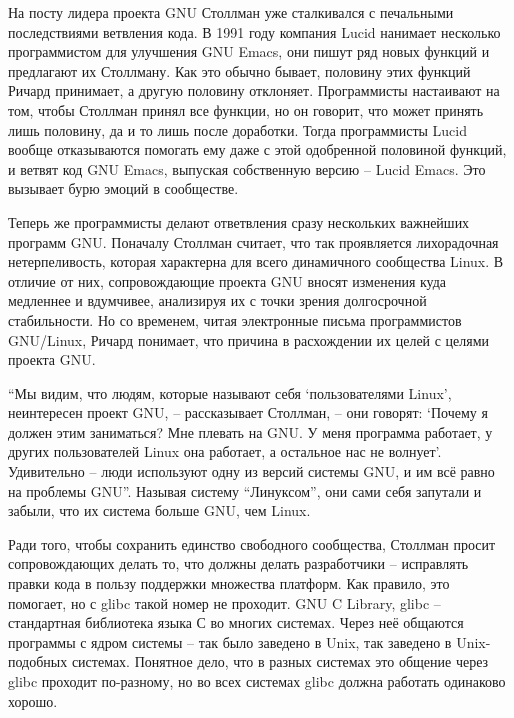 На посту лидера проекта GNU Столлман уже сталкивался с печальными последствиями ветвления кода. В 1991 году компания Lucid нанимает несколько программистом для улучшения GNU Emacs, они пишут ряд новых функций и предлагают их Столлману. Как это обычно бывает, половину этих функций Ричард принимает, а другую половину отклоняет. Программисты настаивают на том, чтобы Столлман принял все функции, но он говорит, что может принять лишь половину, да и то лишь после доработки. Тогда программисты Lucid вообще отказываются помогать ему даже с этой одобренной половиной функций, и ветвят код GNU Emacs, выпуская собственную версию -- Lucid Emacs. Это вызывает бурю эмоций в сообществе.

Теперь же программисты делают ответвления сразу нескольких важнейших программ GNU. Поначалу Столлман считает, что так проявляется лихорадочная нетерпеливость, которая характерна для всего динамичного сообщества Linux. В отличие от них, сопровождающие проекта GNU вносят изменения куда медленнее и вдумчивее, анализируя их с точки зрения долгосрочной стабильности. Но со временем, читая электронные письма программистов GNU/Linux, Ричард понимает, что причина в расхождении их целей с целями проекта GNU.

``Мы видим, что людям, которые называют себя `пользователями Linux', неинтересен проект GNU, -- рассказывает Столлман, -- они говорят: `Почему я должен этим заниматься? Мне плевать на GNU. У меня программа работает, у других пользователей Linux она работает, а остальное нас не волнует'. Удивительно -- люди используют одну из версий системы GNU, и им всё равно на проблемы GNU''. Называя систему ``Линуксом'', они сами себя запутали и забыли, что их система больше GNU, чем Linux.

Ради того, чтобы сохранить единство свободного сообщества, Столлман просит сопровождающих делать то, что должны делать разработчики -- исправлять правки кода в пользу поддержки множества платформ. Как правило, это помогает, но с glibc такой номер не проходит. GNU C Library, glibc -- стандартная библиотека языка С во многих системах. Через неё общаются программы с ядром системы -- так было заведено в Unix, так заведено в Unix-подобных системах. Понятное дело, что в разных системах это общение через glibc проходит по-разному, но во всех системах glibc должна работать одинаково хорошо.

